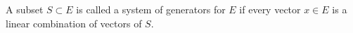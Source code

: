 A subset $S \subset E$ is called a system of generators for $E$ if every vector $x \in E$ is a linear combination of vectors of $S$.
